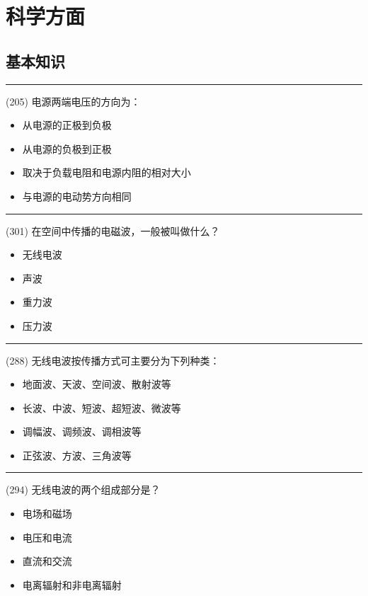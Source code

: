 \documentclass[twocolumn,hyperref,UTF8]{ctexart}  %
\begin{document}
\clearpage
\section{科学方面}


\subsection{基本知识}


\noindent\rule{0.5\textwidth}{1pt}
\heiti (205) 电源两端电压的方向为： \songti {\color{gray} [LK0438] }
\begin{itemize}
	\item  从电源的正极到负极
	\item  从电源的负极到正极
	\item  取决于负载电阻和电源内阻的相对大小
	\item  与电源的电动势方向相同
\end{itemize}


\noindent\rule{0.5\textwidth}{1pt}
\heiti (301) 在空间中传播的电磁波，一般被叫做什么？ \songti {\color{gray} [LK1144] }
\begin{itemize}
	\item  无线电波
	\item  声波
	\item  重力波
	\item  压力波
\end{itemize}


\noindent\rule{0.5\textwidth}{1pt}
\heiti (288) 无线电波按传播方式可主要分为下列种类： \songti {\color{gray} [LK1058] }
\begin{itemize}
	\item  地面波、天波、空间波、散射波等
	\item  长波、中波、短波、超短波、微波等
	\item  调幅波、调频波、调相波等
	\item  正弦波、方波、三角波等
\end{itemize}


\noindent\rule{0.5\textwidth}{1pt}
\heiti (294) 无线电波的两个组成部分是？ \songti {\color{gray} [LK1108] }
\begin{itemize}
	\item  电场和磁场
	\item  电压和电流
	\item  直流和交流
	\item  电离辐射和非电离辐射
\end{itemize}
\end{document}
